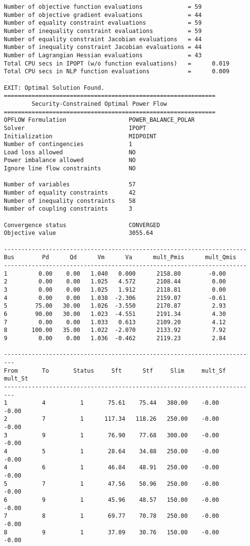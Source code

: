 \begin{lstlisting}
Number of objective function evaluations             = 59
Number of objective gradient evaluations             = 44
Number of equality constraint evaluations            = 59
Number of inequality constraint evaluations          = 59
Number of equality constraint Jacobian evaluations   = 44
Number of inequality constraint Jacobian evaluations = 44
Number of Lagrangian Hessian evaluations             = 43
Total CPU secs in IPOPT (w/o function evaluations)   =      0.019
Total CPU secs in NLP function evaluations           =      0.009

EXIT: Optimal Solution Found.
=============================================================
        Security-Constrained Optimal Power Flow
=============================================================
OPFLOW Formulation                  POWER_BALANCE_POLAR
Solver                              IPOPT
Initialization                      MIDPOINT
Number of contingencies             1
Load loss allowed                   NO
Power imbalance allowed             NO
Ignore line flow constraints        NO

Number of variables                 57
Number of equality constraints      42
Number of inequality constraints    58
Number of coupling constraints      3

Convergence status                  CONVERGED
Objective value                     3055.64

----------------------------------------------------------------------
Bus        Pd      Qd      Vm      Va      mult_Pmis      mult_Qmis
----------------------------------------------------------------------
1         0.00    0.00   1.040   0.000      2158.80        -0.00
2         0.00    0.00   1.025   4.572      2108.44         0.00
3         0.00    0.00   1.025   1.912      2118.81         0.00
4         0.00    0.00   1.038  -2.306      2159.07        -0.61
5        75.00   30.00   1.026  -3.550      2170.87         2.93
6        90.00   30.00   1.023  -4.551      2191.34         4.30
7         0.00    0.00   1.033   0.613      2109.20         4.12
8       100.00   35.00   1.022  -2.070      2133.92         7.92
9         0.00    0.00   1.036  -0.462      2119.23         2.84

-------------------------------------------------------------------------
From       To       Status     Sft      Stf     Slim     mult_Sf  mult_St
-------------------------------------------------------------------------
1          4          1       75.61    75.44   380.00    -0.00    -0.00
2          7          1      117.34   118.26   250.00    -0.00    -0.00
3          9          1       76.90    77.68   300.00    -0.00    -0.00
4          5          1       28.64    34.88   250.00    -0.00    -0.00
4          6          1       46.84    48.91   250.00    -0.00    -0.00
5          7          1       47.56    50.96   250.00    -0.00    -0.00
6          9          1       45.96    48.57   150.00    -0.00    -0.00
7          8          1       69.77    70.78   250.00    -0.00    -0.00
8          9          1       37.09    30.76   150.00    -0.00    -0.00


\end{lstlisting}
